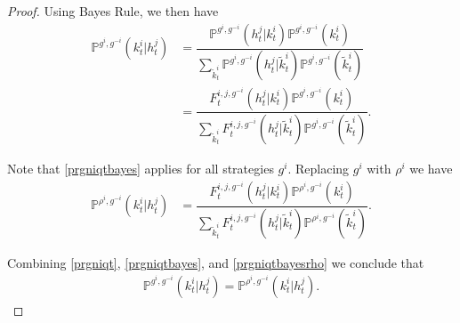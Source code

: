 \documentclass[pdflatex,sn-basic]{sn-jnl}
\renewcommand{\Pr}{\mathbb{P}}
\newcommand{\comp}{k}
\theoremstyle{thmstyleone}%
\theoremstyle{thmstyletwo}%
\theoremstyle{thmstylethree}%
\begin{document}
\begin{appendices}
\begin{proof}
    {Using Bayes Rule, we then have}
    \begin{align}
		\Pr^{g^{i}, g^{-i}}(\comp_t^i|h_t^j) &= \dfrac{\Pr^{g^{i}, g^{-i}}(h_t^j|\comp_t^i)\Pr^{g^{i}, g^{-i}}(\comp_t^i) }{\sum_{\tilde{\comp}_t^i} \Pr^{g^{i}, g^{-i}}(h_t^j|\tilde{\comp}_t^i)\Pr^{g^{i}, g^{-i}}(\tilde{\comp}_t^i) }\\
		&=\dfrac{F_t^{i, j, g^{-i}}(h_t^j|\comp_t^i)  \Pr^{g^{i}, g^{-i}}(\comp_t^i)}{\sum_{\tilde{\comp}_t^i} F_t^{i, j, g^{-i}}(h_t^j|\tilde{\comp}_t^i)  \Pr^{g^{i}, g^{-i}}(\tilde{\comp}_t^i)}.\label{prgniqtbayes}
	\end{align}
	
	{Note that \eqref{prgniqtbayes} applies for all strategies $g^i$. Replacing $g^i$ with $\rho^i$ we have}
    \begin{align}
		\Pr^{\rho^{i}, g^{-i}}(\comp_t^i|h_t^j) &= \dfrac{F_t^{i, j, g^{-i}}(h_t^j|\comp_t^i)  \Pr^{\rho^{i}, g^{-i}}(\comp_t^i)}{\sum_{\tilde{\comp}_t^i} F_t^{i, j, g^{-i}}(h_t^j|\tilde{\comp}_t^i)  \Pr^{\rho^{i}, g^{-i}}(\tilde{\comp}_t^i)}.\label{prgniqtbayesrho}
	\end{align}
	
    Combining \eqref{prgniqt}, \eqref{prgniqtbayes}, and \eqref{prgniqtbayesrho} we conclude that
	\begin{align}
		\Pr^{g^{i}, g^{-i}}(\comp_t^i|h_t^j) = \Pr^{\rho^{i}, g^{-i}}(\comp_t^i|h_t^j).\label{eq:initdistalsook}
	\end{align}
	

\end{proof}
\end{appendices}
\end{document}
